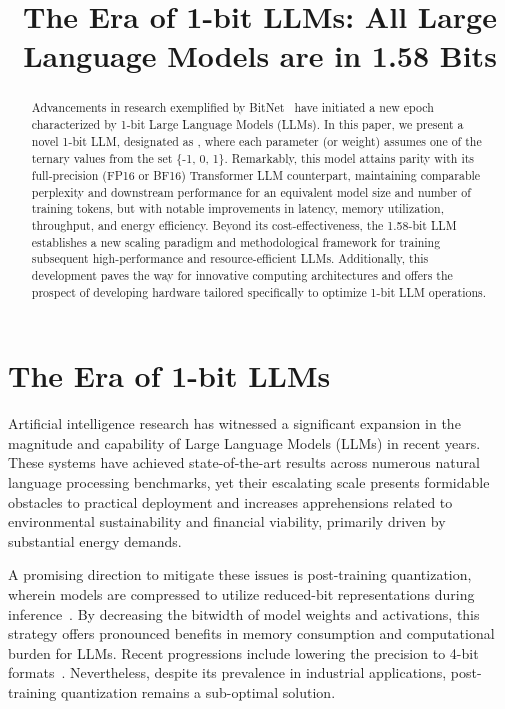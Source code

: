 \title{The Era of 1-bit LLMs: All Large Language Models are in 1.58 Bits}

\begin{abstract}
Advancements in research exemplified by BitNet~\cite{bitnet} have initiated a new epoch characterized by 1-bit Large Language Models (LLMs). In this paper, we present a novel 1-bit LLM, designated as \textbf{}, where each parameter (or weight) assumes one of the ternary values from the set \{-1, 0, 1\}. Remarkably, this model attains parity with its full-precision (FP16 or BF16) Transformer LLM counterpart, maintaining comparable perplexity and downstream performance for an equivalent model size and number of training tokens, but with notable improvements in latency, memory utilization, throughput, and energy efficiency. Beyond its cost-effectiveness, the 1.58-bit LLM establishes a new scaling paradigm and methodological framework for training subsequent high-performance and resource-efficient LLMs. Additionally, this development paves the way for innovative computing architectures and offers the prospect of developing hardware tailored specifically to optimize 1-bit LLM operations.
\end{abstract}

\section{The Era of 1-bit LLMs}

Artificial intelligence research has witnessed a significant expansion in the magnitude and capability of Large Language Models (LLMs) in recent years. These systems have achieved state-of-the-art results across numerous natural language processing benchmarks, yet their escalating scale presents formidable obstacles to practical deployment and increases apprehensions related to environmental sustainability and financial viability, primarily driven by substantial energy demands.

A promising direction to mitigate these issues is post-training quantization, wherein models are compressed to utilize reduced-bit representations during inference~\cite{smoothquant, gptq, quip, quip_sharp}. By decreasing the bitwidth of model weights and activations, this strategy offers pronounced benefits in memory consumption and computational burden for LLMs. Recent progressions include lowering the precision to 4-bit formats~\cite{gptq, awq}. Nevertheless, despite its prevalence in industrial applications, post-training quantization remains a sub-optimal solution.

